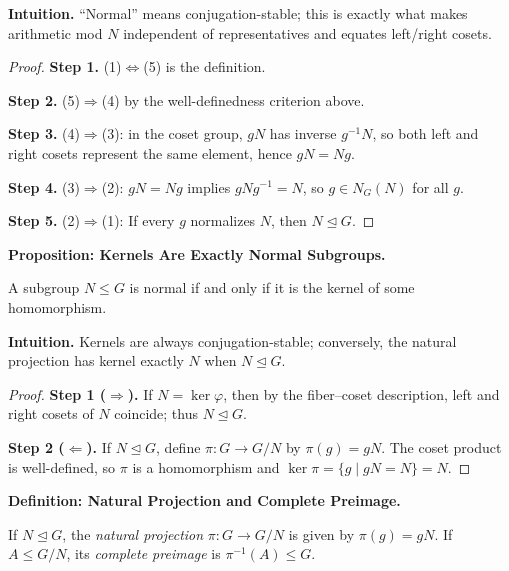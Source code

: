 \documentclass[9pt]{article}
\theoremstyle{definition}
\begin{document}
\dotfill

\noindent\textbf{Intuition.}
“Normal” means conjugation-stable; this is exactly what makes arithmetic mod $N$ independent of representatives and equates left/right cosets.

\dotfill

\begin{proof}
\textbf{Step 1.} (1)$\Leftrightarrow$(5) is the definition.

\textbf{Step 2.} (5)$\Rightarrow$(4) by the well-definedness criterion above.

\textbf{Step 3.} (4)$\Rightarrow$(3): in the coset group, $gN$ has inverse $g^{-1}N$, so both left and right cosets represent the same element, hence $gN=Ng$.

\textbf{Step 4.} (3)$\Rightarrow$(2): $gN=Ng$ implies $gNg^{-1}=N$, so $g\in N_G(N)$ for all $g$.

\textbf{Step 5.} (2)$\Rightarrow$(1): If every $g$ normalizes $N$, then $N\trianglelefteq G$.
\end{proof}

\newpage

\noindent\textbf{Proposition: Kernels Are Exactly Normal Subgroups.}

\newpage

A subgroup $N\le G$ is normal if and only if it is the kernel of some homomorphism.

\dotfill

\noindent\textbf{Intuition.}
Kernels are always conjugation-stable; conversely, the natural projection has kernel exactly $N$ when $N\trianglelefteq G$.

\dotfill

\begin{proof}
\textbf{Step 1 ($\Rightarrow$).} If $N=\ker\varphi$, then by the fiber–coset description, left and right cosets of $N$ coincide; thus $N\trianglelefteq G$.

\textbf{Step 2 ($\Leftarrow$).} If $N\trianglelefteq G$, define $\pi:G\to G/N$ by $\pi(g)=gN$. The coset product is well-defined, so $\pi$ is a homomorphism and $\ker\pi=\{g\mid gN=N\}=N$.
\end{proof}

\newpage

\noindent\textbf{Definition: Natural Projection and Complete Preimage.}

\newpage

If $N\trianglelefteq G$, the \emph{natural projection} $\pi:G\to G/N$ is given by $\pi(g)=gN$. If $A\le G/N$, its \emph{complete preimage} is $\pi^{-1}(A)\le G$.
\end{document}
